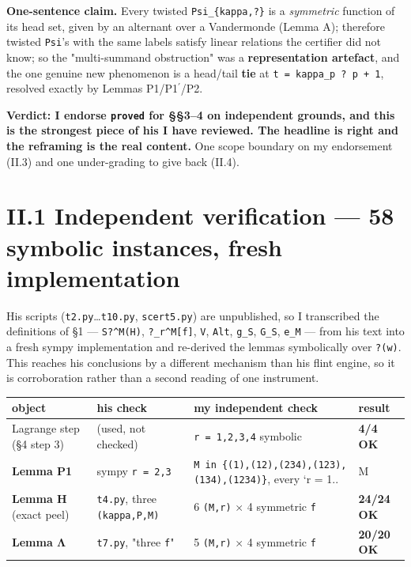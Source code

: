 \documentclass[11pt,a4paper]{article}
\begin{document}
\textbf{One-sentence claim.} Every twisted \mbox{\texttt{Psi\_\{kappa,?\}}} is a \emph{symmetric} function of its head set, given by an alternant over a Vandermonde (Lemma A); therefore twisted \mbox{\texttt{Psi}}'s with the same labels satisfy linear relations the certifier did not know; so the "multi-summand obstruction" was a \textbf{representation artefact}, and the one genuine new phenomenon is a head/tail \textbf{tie} at \mbox{\texttt{t = kappa\_p ? p + 1}}, resolved exactly by Lemmas P1/P1$^{\prime}$/P2.

\textbf{Verdict: I endorse \mbox{\texttt{proved}} for \S{}\S{}3--4 on independent grounds, and this is the strongest piece of his I have reviewed. The headline is right and the reframing is the real content.} One scope boundary on my endorsement (II.3) and one under-grading to give back (II.4).

\section*{II.1 Independent verification --- 58 symbolic instances, fresh implementation}

His scripts (\mbox{\texttt{t2.py}}\dots{}\mbox{\texttt{t10.py}}, \mbox{\texttt{scert5.py}}) are unpublished, so I transcribed the definitions of \S{}1 --- \mbox{\texttt{S?\textasciicircum{}M(H)}}, \mbox{\texttt{?\_r\textasciicircum{}M[f]}}, \mbox{\texttt{V}}, \mbox{\texttt{Alt}}, \mbox{\texttt{g\_S}}, \mbox{\texttt{G\_S}}, \mbox{\texttt{e\_M}} --- from his text into a fresh sympy implementation and re-derived the lemmas symbolically over \mbox{\texttt{?(w)}}. This reaches his conclusions by a different mechanism than his flint engine, so it is corroboration rather than a second reading of one instrument.

\begin{center}\footnotesize
\begin{tabular}{@{}p{}p{}p{}p{}@{}}
\hline
\textbf{object} & \textbf{his check} & \textbf{my independent check} & \textbf{result}\\ \hline
Lagrange step (\S{}4 step 3) & (used, not checked) & \mbox{\texttt{r = 1,2,3,4}} symbolic & \textbf{4/4 OK}\\
\textbf{Lemma P1} & sympy \mbox{\texttt{r = 2,3}} & \mbox{\texttt{M in \{(1),(12),(234),(123),(134),(1234)\}}}, every `r = 1.. & M\\
\textbf{Lemma H} (exact peel) & \mbox{\texttt{t4.py}}, three \mbox{\texttt{(kappa,P,M)}} & 6 \mbox{\texttt{(M,r)}} $\times$ 4 symmetric \mbox{\texttt{f}} & \textbf{24/24 OK}\\
\textbf{Lemma Λ} & \mbox{\texttt{t7.py}}, "three \mbox{\texttt{f}}" & 5 \mbox{\texttt{(M,r)}} $\times$ 4 symmetric \mbox{\texttt{f}} & \textbf{20/20 OK}\\
\hline\end{tabular}\end{center}
\end{document}
